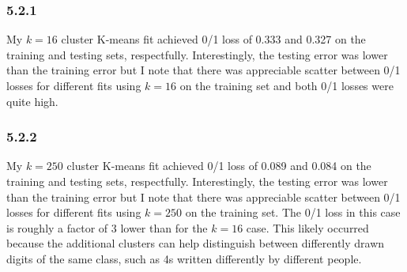 \documentclass[12pt]{amsart}
\begin{document}
\subsubsection*{5.2.1}
My $k = 16$ cluster K-means fit achieved 0/1 loss of 0.333 and 0.327 on the training and testing sets, respectfully.  Interestingly, the testing error was lower than the training error but I note that there was appreciable scatter between 0/1 losses for different fits using $k = 16$ on the training set and both 0/1 losses were quite high.

\subsubsection*{5.2.2}
My $k = 250$ cluster K-means fit achieved 0/1 loss of 0.089 and 0.084 on the training and testing sets, respectfully.  Interestingly, the testing error was lower than the training error but I note that there was appreciable scatter between 0/1 losses for different fits using $k = 250$ on the training set.  The 0/1 loss in this case is roughly a factor of 3 lower than for the $k = 16$ case.  This likely occurred because the additional clusters can help distinguish between differently drawn digits of the same class, such as 4s written differently by different people.
\end{document}

